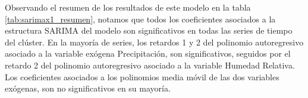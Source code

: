 \documentclass[12pt,oneside]{book}\usepackage[]{graphicx}\usepackage[]{color}
\newenvironment{knitrout}{}{} %
\theoremstyle{definition} %
\begin{document}
Observando el resumen de los resultados de este modelo en la tabla \ref{tab:sarimax1_resumen}, notamos que todos los coeficientes asociados a la estructura SARIMA del modelo son significativos en todas las series de tiempo del clúster. En la mayoría de series, los retardos 1 y 2 del polinomio autoregresivo asociado a la variable exógena Precipitación, son significativos, seguidos por el retardo 2 del polinomio autoregresivo asociado a la variable Humedad Relativa. Los coeficientes asociados a los polinomios media móvil de las dos variables exógenas, son no significativos en su mayoría.






\begin{knitrout}
\color{fgcolor}
\begin{landscape}\begin{table}


\end{table}
\end{landscape}
\end{knitrout}
\end{document}
